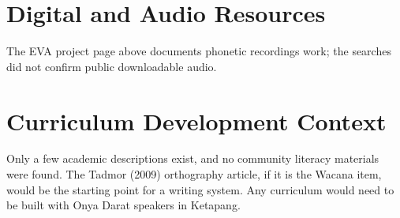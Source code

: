 \documentclass[12pt]{article}
\begin{document}
\section{Digital and Audio Resources}
The EVA project page above documents phonetic recordings work; the searches did not confirm public downloadable audio.

\section{Curriculum Development Context}
Only a few academic descriptions exist, and no community literacy materials were found. The Tadmor (2009) orthography article, if it is the Wacana item, would be the starting point for a writing system. Any curriculum would need to be built with Onya Darat speakers in Ketapang.
\end{document}
